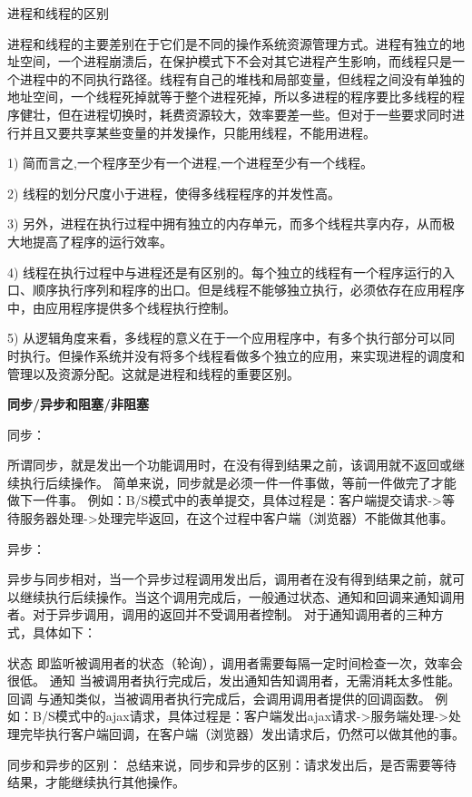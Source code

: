 \documentclass[UTF8]{ctexart}
\begin{document}
进程和线程的区别

进程和线程的主要差别在于它们是不同的操作系统资源管理方式。进程有独立的地址空间，一个进程崩溃后，在保护模式下不会对其它进程产生影响，而线程只是一个进程中的不同执行路径。线程有自己的堆栈和局部变量，但线程之间没有单独的地址空间，一个线程死掉就等于整个进程死掉，所以多进程的程序要比多线程的程序健壮，但在进程切换时，耗费资源较大，效率要差一些。但对于一些要求同时进行并且又要共享某些变量的并发操作，只能用线程，不能用进程。

 1) 简而言之,一个程序至少有一个进程,一个进程至少有一个线程。

 2) 线程的划分尺度小于进程，使得多线程程序的并发性高。

 3) 另外，进程在执行过程中拥有独立的内存单元，而多个线程共享内存，从而极大地提高了程序的运行效率。

 4) 线程在执行过程中与进程还是有区别的。每个独立的线程有一个程序运行的入口、顺序执行序列和程序的出口。但是线程不能够独立执行，必须依存在应用程序中，由应用程序提供多个线程执行控制。

 5) 从逻辑角度来看，多线程的意义在于一个应用程序中，有多个执行部分可以同时执行。但操作系统并没有将多个线程看做多个独立的应用，来实现进程的调度和管理以及资源分配。这就是进程和线程的重要区别。

\textbf{同步/异步和阻塞/非阻塞}

同步：

所谓同步，就是发出一个功能调用时，在没有得到结果之前，该调用就不返回或继续执行后续操作。
简单来说，同步就是必须一件一件事做，等前一件做完了才能做下一件事。
例如：B/S模式中的表单提交，具体过程是：客户端提交请求->等待服务器处理->处理完毕返回，在这个过程中客户端（浏览器）不能做其他事。

异步：

异步与同步相对，当一个异步过程调用发出后，调用者在没有得到结果之前，就可以继续执行后续操作。当这个调用完成后，一般通过状态、通知和回调来通知调用者。对于异步调用，调用的返回并不受调用者控制。
对于通知调用者的三种方式，具体如下：

状态
即监听被调用者的状态（轮询），调用者需要每隔一定时间检查一次，效率会很低。
通知
当被调用者执行完成后，发出通知告知调用者，无需消耗太多性能。
回调
与通知类似，当被调用者执行完成后，会调用调用者提供的回调函数。
例如：B/S模式中的ajax请求，具体过程是：客户端发出ajax请求->服务端处理->处理完毕执行客户端回调，在客户端（浏览器）发出请求后，仍然可以做其他的事。

同步和异步的区别：
总结来说，同步和异步的区别：请求发出后，是否需要等待结果，才能继续执行其他操作。
\end{document}
